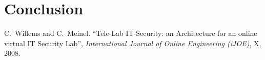\documentclass[a4paper,12pt,pagesize,headsepline,bibtotoc,titlepage]{scrartcl}
\begin{document}
\section{Conclusion}
\label{sec:conclusion}



\newpage
\begin{thebibliography}{1}

C.~Willems and C.~Meinel.
``Tele-Lab IT-Security: an Architecture for an online virtual IT Security Lab'',
\emph{International Journal of Online Engineering (iJOE)},
X, 2008.

\end{thebibliography}
\end{document}
